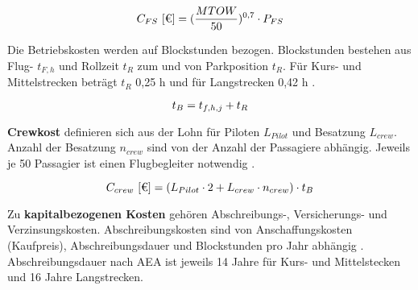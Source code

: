 \begin{equation}
   {C_{FS} ~[\text{€}]} = (\frac{MTOW}{50})^{0,7} \cdot P_{FS} \\
   \label{Flugsicherung}
\end{equation}

Die Betriebskosten werden auf Blockstunden bezogen. Blockstunden bestehen aus Flug- $t_{F,h}$ und Rollzeit $t_{R}$ zum und von Parkposition
$t_{R}$. Für Kurs- und Mittelstrecken beträgt $t_{R}$ {0,25 h} und für Langstrecken 0,42 h \cite{scholz_design_evaluation_doc}.

\begin{equation}
   t_{B} = t_{f,h,j} + t_{R} \\
   \label{blockzeit}
\end{equation}

\textbf{Crewkost} definieren sich aus der Lohn für Piloten $L_{Pilot}$ und Besatzung $L_{crew}$. Anzahl der Besatzung $n_{crew}$ sind 
von der Anzahl der Passagiere abhängig. Jeweils je 50 Passagier ist einen Flugbegleiter notwendig \cite{conrady2019luftverkehr}.

\begin{equation}
   {C_{crew} ~[\text{€}]} = ({L}_{Pilot} \cdot 2 + {L}_{crew} \cdot n_{crew} ) \cdot t_{B} \\
   \label{crew cost}
\end{equation}





 

Zu \textbf{kapitalbezogenen Kosten} gehören Abschreibungs-, Versicherungs- und Verzinsungskosten. 
Abschreibungskosten sind von Anschaffungskosten (Kaufpreis), Abschreibungsdauer und Blockstunden pro Jahr abhängig \cite{conrady2019luftverkehr}.
Abschreibungsdauer nach AEA ist jeweils 14 Jahre für Kurs- und Mittelstecken und 16 Jahre Langstrecken.

